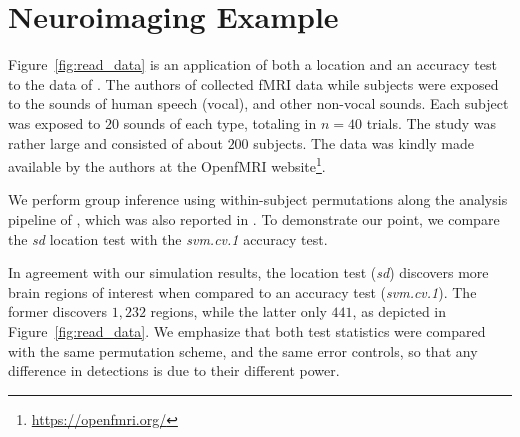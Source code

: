 \documentclass[12pt,a4paper]{article}
\begin{document}
\section{Neuroimaging Example}
\label{sec:example}

Figure~\ref{fig:read_data} is an application of both a location and an accuracy test to the data of \cite{pernet_human_2015}. 
The authors of \cite{pernet_human_2015} collected fMRI data while subjects were exposed to the sounds of human speech (vocal), and other non-vocal sounds. 
Each subject was exposed to $20$ sounds of each type, totaling in $n=40$ trials.
The study was rather large and consisted of about $200$ subjects.
The data was kindly made available by the authors at the OpenfMRI website\footnote{\url{https://openfmri.org/}}.

We perform group inference using within-subject permutations along the analysis pipeline of \cite{stelzer_statistical_2013}, which was also reported in \cite{gilron_quantifying_2016}. 
To demonstrate our point, we compare the \emph{sd} location test with the \emph{svm.cv.1} accuracy test. 

In agreement with our simulation results, the location test (\emph{sd}) discovers more brain regions of interest when compared to an accuracy test (\emph{svm.cv.1}).
The former discovers $1,232$ regions, while the latter only $441$, as depicted in Figure~\ref{fig:read_data}.
We emphasize that both test statistics were compared with the same permutation scheme, and the same error controls, so that any difference in detections is due to their different power.
\end{document}
